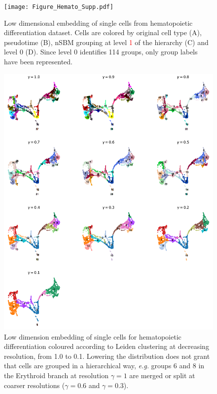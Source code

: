 \documentclass[11pt, titlepage, twoside]{article}
\begin{document}
\begin{figure}[htbp]
\centering
\texttt{[image: Figure\_Hemato\_Supp.pdf]}
\caption[]{Low dimensional embedding of single cells from hematopoietic differentiation dataset. Cells are colored by original cell type (A), pseudotime (B), nSBM grouping at level \textcolor{red}{1} of the hierarchy (C) and level 0 (D). Since level 0 identifies 114 groups, only group labels have been represented.}\label{Figure_Hemato_Supp}
\end{figure}
\clearpage

\begin{figure}[htbp]
\centering
\includegraphics[keepaspectratio,width=\textwidth,height=0.75\textheight]{Figure_Paul15_Leiden_r.pdf}
\caption[]{Low dimension embedding of single cells for hematopoietic differentiation coloured according to Leiden clustering at decreasing resolution, from 1.0 to 0.1. Lowering the distribution does not grant that cells are grouped in a hierarchical way, \emph{e.g.} groups 6 and 8 in the Erythroid branch at resolution $\gamma=1$ are merged or split at coarser resolutions ($\gamma=0.6$ and $\gamma=0.3$).}\label{Figure_Paul15_Leiden_r}
\end{figure}
\clearpage
\end{document}
